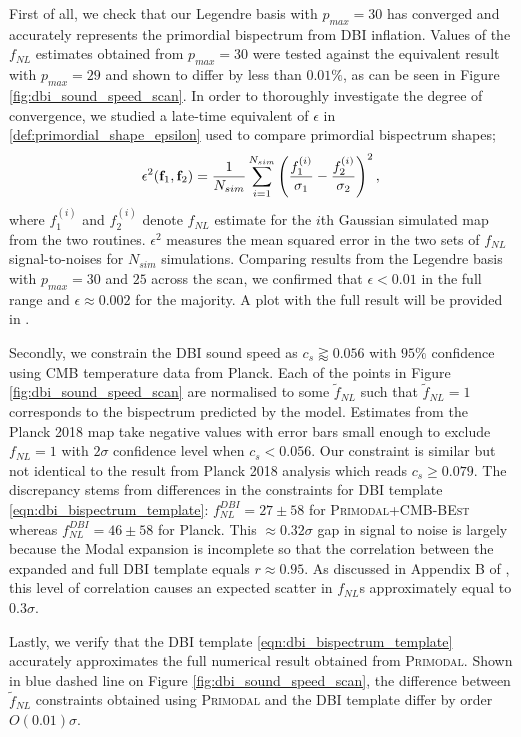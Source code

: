 First of all, we check that our Legendre basis with $p_{max}=30$ has converged and accurately represents the primordial bispectrum from DBI inflation. Values of the $f_{NL}$ estimates obtained from $p_{max}=30$ were tested against the equivalent result with $p_{max}=29$ and shown to differ by less than $0.01\%$, as can be seen in Figure \ref{fig:dbi_sound_speed_scan}. In order to thoroughly investigate the degree of convergence, we studied a late-time equivalent of $\epsilon$ in  \eqref{def:primordial_shape_epsilon} used to compare primordial bispectrum shapes;
\begin{align}
	\epsilon^2 (\mathbf{f}_1, \mathbf{f}_2) = \frac{1}{N_{sim}}  \sum_{i=1}^{N_{sim}} \left( \frac{f^{(i)}_1}{\sigma_1} - \frac{f^{(i)}_2}{\sigma_2} \right)^2,
\end{align}
where $f^{(i)}_1$ and $f^{(i)}_2$ denote $f_{NL}$ estimate for the $i$th Gaussian simulated map from the two routines. $\epsilon^2$ measures the mean squared error in the two sets of $f_{NL}$ signal-to-noises for $N_{sim}$ simulations. Comparing results from the Legendre basis with $p_{max} = 30$ and $25$ across the scan, we confirmed that $\epsilon < 0.01$ in the full range and $\epsilon \approx 0.002$ for the majority. A plot with the full result will be provided in \cite{Sohn2021inprep}.

Secondly, we constrain the DBI sound speed as $c_s \gtrapprox 0.056$ with $95\%$ confidence using CMB temperature data from Planck. Each of the points in Figure \ref{fig:dbi_sound_speed_scan} are normalised to some $\tilde{f}_{NL}$ such that $\tilde{f}_{NL}=1$ corresponds to the bispectrum predicted by the model. Estimates from the Planck 2018 map take negative values with error bars small enough to exclude $f_{NL}=1$ with $2\sigma$ confidence level when $c_s < 0.056$. Our constraint is similar but not identical to the result from Planck 2018 analysis which reads $c_s \ge 0.079$. The discrepancy stems from differences in the constraints for DBI template \eqref{eqn:dbi_bispectrum_template}: $f^{DBI}_{NL}=27 \pm 58$ for \textsc{Primodal}+\textsc{CMB-BEst} whereas $f^{DBI}_{NL}=46 \pm 58$ for Planck. This $\approx0.32\sigma$ gap in signal to noise is largely because the Modal expansion is incomplete so that the correlation between the expanded and full DBI template equals $r\approx 0.95$. As discussed in Appendix B of \cite{PlanckCollaboration2013}, this level of correlation causes an expected scatter in $f_{NL}$s approximately equal to $0.3\sigma$.

Lastly, we verify that the DBI template \eqref{eqn:dbi_bispectrum_template} accurately approximates the full numerical result obtained from \textsc{Primodal}. Shown in blue dashed line on Figure \ref{fig:dbi_sound_speed_scan}, the difference between $\tilde{f}_{NL}$ constraints obtained using \textsc{Primodal} and the DBI template differ by order $O(0.01)\sigma$.

